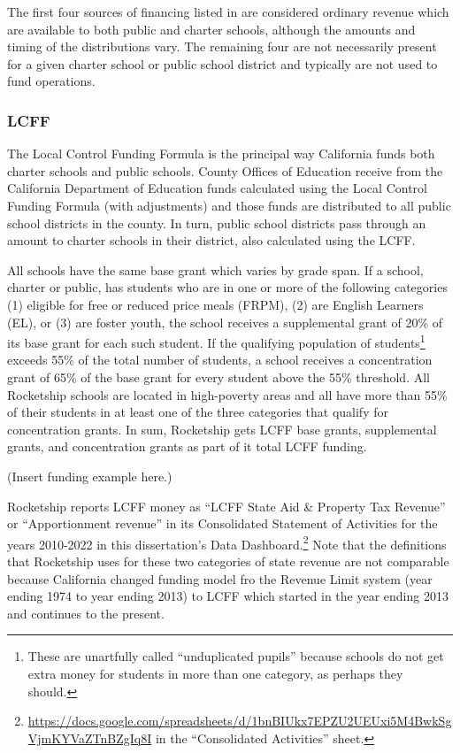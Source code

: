 The first four sources of financing listed in  are considered ordinary revenue which are available to both public and charter schools, although the amounts and timing of the distributions vary. The remaining four are not necessarily present for a given charter school or public school district and typically are not used to fund operations.

\subsubsection{LCFF}%
\label{sec:lcff}\indent%

The Local Control Funding Formula is the principal way California funds both charter schools and public schools. County Offices of Education receive from the California Department of Education funds calculated using the Local Control Funding Formula (with adjustments) and those funds are distributed to all public school districts in the county. In turn, public school districts pass through an amount to charter schools in their district, also calculated using the LCFF.

All schools have the same base grant which varies by grade span. If a school, charter or public, has students who are in one or more of the following categories (1) eligible for free or reduced price meals (FRPM), (2) are English Learners (EL), or (3) are foster youth, the school receives a supplemental grant of 20\% of its base grant for each such student. If the qualifying population of students\footnote{These are unartfully called ``unduplicated pupils'' because schools do not get extra money for students in more than one category, as perhaps they should.} exceeds 55\% of the total number of students, a school receives a concentration grant of 65\% of the base grant for every student above the 55\% threshold. All Rocketship schools are located in high-poverty areas and all have more than 55\% of their students in at least one of the three categories that qualify for concentration grants. In sum, Rocketship gets LCFF base grants, supplemental grants, and concentration grants as part of it total LCFF funding.

(Insert funding example here.)

Rocketship reports LCFF money as ``LCFF State Aid \& Property Tax Revenue'' or ``Apportionment revenue'' in its Consolidated Statement of Activities for the years 2010-2022 in this dissertation's Data Dashboard.\footnote{\url{https://docs.google.com/spreadsheets/d/1bnBIUkx7EPZU2UEUxi5M4BwkSgVjmKYVaZTnBZgIq8I} in the ``Consolidated Activities'' sheet.} Note that the definitions that Rocketship uses for these two categories of state revenue are not comparable because California changed funding model fro the Revenue Limit system (year ending 1974 to year ending 2013) to LCFF which started in the year ending 2013 and continues to the present.

